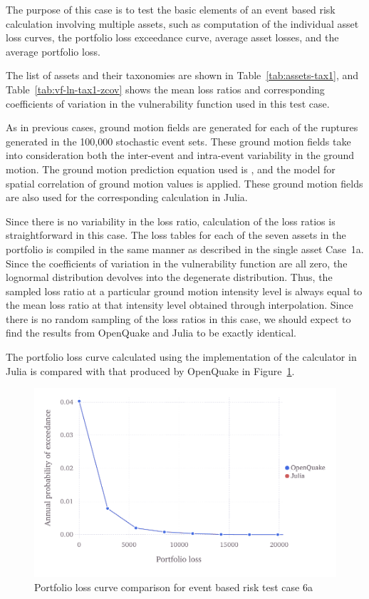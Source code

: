 The purpose of this case is to test the basic elements of an event based risk calculation involving multiple assets, such as computation of the individual asset loss curves, the portfolio loss exceedance curve, average asset losses, and the average portfolio loss.

The list of assets and their taxonomies are shown in Table~\ref{tab:assets-tax1}, and Table~\ref{tab:vf-ln-tax1-zcov} shows the mean loss ratios and corresponding coefficients of variation in the vulnerability function used in this test case.

As in previous cases, ground motion fields are generated for each of the ruptures generated in the 100,000 stochastic event sets. These ground motion fields take into consideration both the inter-event and intra-event variability in the ground motion. The ground motion prediction equation used is \citet{boore2008}, and the \citet{jayaram2009} model for spatial correlation of ground motion values is applied. These ground motion fields are also used for the corresponding calculation in Julia.

Since there is no variability in the loss ratio, calculation of the loss ratios is straightforward in this case. The loss tables for each of the seven assets in the portfolio is compiled in the same manner as described in the single asset Case~1a. Since the coefficients of variation in the vulnerability function are all zero, the lognormal distribution devolves into the degenerate distribution. Thus, the sampled loss ratio at a particular ground motion intensity level is always equal to the mean loss ratio at that intensity level obtained through interpolation. Since there is no random sampling of the loss ratios in this case, we should expect to find the results from OpenQuake and Julia to be exactly identical.

The portfolio loss curve calculated using the implementation of the calculator in Julia is compared with that produced by OpenQuake in Figure~\ref{fig:lc-ebr-6a}.

\begin{figure}[htbp]
\centering
\includegraphics[width=12cm]{qareport/figures/fig-lc-ebr-6a}
\caption{Portfolio loss curve comparison for event based risk test case 6a}
\label{fig:lc-ebr-6a}
\end{figure}
